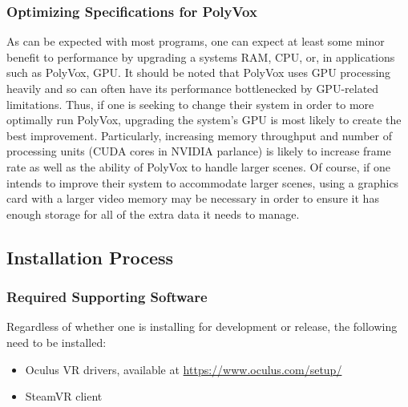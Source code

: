 \documentclass[onecolumn, draftclsnofoot,10pt, compsoc]{IEEEtran}
\begin{document}
\subsubsection{Optimizing Specifications for PolyVox}
As can be expected with most programs, one can expect at least some minor benefit to performance by upgrading a systems RAM, CPU, or, in applications such as PolyVox, GPU.
It should be noted that PolyVox uses GPU processing heavily and so can often have its performance bottlenecked by GPU-related limitations.
Thus, if one is seeking to change their system in order to more optimally run PolyVox, upgrading the system’s GPU is most likely to create the best improvement.
Particularly, increasing memory throughput and number of processing units (CUDA cores in NVIDIA parlance) is likely to increase frame rate as well as the ability of PolyVox to handle larger scenes.
Of course, if one intends to improve their system to accommodate larger scenes, using a graphics card with a larger video memory may be necessary in order to ensure it has enough storage for all of the extra data it needs to manage.

\subsection{Installation Process}
\subsubsection{Required Supporting Software}
Regardless of whether one is installing for development or release, the following need to be installed:
\begin{itemize}
\item Oculus VR drivers, available at \url{https://www.oculus.com/setup/}
\item SteamVR client
\end{itemize}
\end{document}
